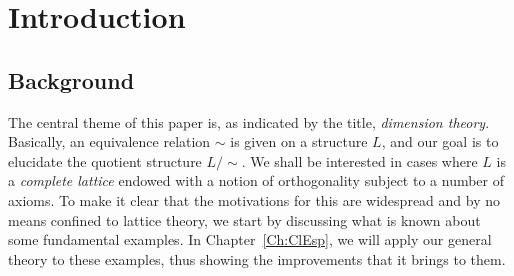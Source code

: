 \documentclass[psamsfonts,reqno]{memo-l}
\theoremstyle{plain}
\theoremstyle{definition}
\theoremstyle{remark}
\numberwithin{equation}{section}
\newcommand{\two}{\mathbf{2}}
\newcommand{\CC}{\mathbf{C}}
\newcommand{\I}{\mathrm{I}}
\newcommand{\II}{\mathrm{II}}
\newcommand{\III}{\mathrm{III}}
\newcommand{\ZZ}{\mathbb{Z}}
\newcommand{\RR}{\mathbb{R}}
\newcommand{\cm}{commutative mon\-oid}
\newcommand{\set}[1]{\{#1\}}
\newcommand{\setm}[2]{\set{#1\mid#2}}
\begin{document}
\begin{abstract}
\begin{enumerate}
\end{enumerate}
We prove that the dimension range of any
espalier
$(L,\leq,\perp,\sim)$ is a \emph{lower interval} of a \cm\ of the form
   \begin{equation}
   \CC(\Omega_{\I},\ZZ_\gamma)\times\CC(\Omega_{\II},\RR_\gamma)
   \times\CC(\Omega_{\III},\two_\gamma),\tag{*}
   \end{equation}
where $\Omega_{\I}$, $\Omega_{\II}$, and $\Omega_{\III}$ are complete
Boolean spaces,
and where we put, for every ordinal $\gamma$,
   \begin{align*}
   \ZZ_\gamma&=\ZZ^+\cup\setm{\aleph_\xi}{0\leq\xi\leq\gamma},\\
   \RR_\gamma&=\RR^+\cup\setm{\aleph_\xi}{0\leq\xi\leq\gamma},\\
   \two_\gamma&=\set{0}\cup\setm{\aleph_\xi}{0\leq\xi\leq\gamma},
   \end{align*}
\index{Zzzgamma@$\ZZ_\gamma$}\index{Rzzgamma@$\RR_\gamma$}%
\index{Tzzgamma@$\two_\gamma$}%
endowed with their interval topology
and natural addition operations.
Conversely, we prove that every lower interval of a monoid of the form
(*) can be represented as the dimension range of an
espalier arising from each of the contexts (i)--(iv) above.
The context of W*-algebras requires the spaces
$\Omega_{\I}$, $\Omega_{\II}$, and $\Omega_{\III}$ to be
\emph{hyperstonian}, and no further restriction is needed.

This subsumes many earlier dimension-theoretic results,
and, in applications, completes theories developed for examples such as
(i)--(iv) above.
\end{abstract}

\maketitle

\tableofcontents

\chapter{Introduction}\label{Ch:Intro}

\section{Background}\label{S:Backgr}

The central theme of this paper is, as indicated by the title,
\emph{dimension theory}. Basically, an equivalence relation $\sim$ is given
on a structure $L$, and our goal is to elucidate the quotient structure
$L/{\sim}$. We shall be interested in cases where $L$ is a \emph{complete
lattice} endowed with a notion of orthogonality
subject to a number of axioms. To make it clear that the motivations for
this are widespread and by no means confined to lattice theory, we start by
discussing what is known about some fundamental examples. In
Chapter~\ref{Ch:ClEsp}, we will apply our general theory to these examples,
thus showing the improvements that it brings to them.
\end{document}
